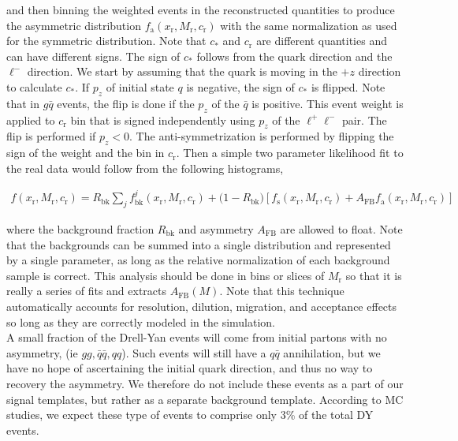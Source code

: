 \documentclass[
    10pt, %
    a4paper, %
    oneside, %
    headinclude,footinclude, %
    BCOR5mm, %
]{scrartcl}
\begin{document}
and then binning the weighted events in the reconstructed quantities to produce the asymmetric distribution $f_\mathrm{a}(x_\mathrm{r}, M_\mathrm{r}, c_\mathrm{r})$ 
with the same normalization as used for the symmetric distribution.  
Note that $c_*$ and $c_\mathrm{r}$ are different quantities and can have different signs.  
The sign of $c_*$ follows from the quark direction and the $\ell^-$ direction.  
We start by assuming that the quark is moving in the $+z$ direction to calculate $c_*$.  
If $p_z$ of initial state $q$ is negative, the sign of $c_*$ is flipped.  Note that in $g\bar q$ events, 
the flip is done if the $p_z$ of the $\bar q$ is positive.  
This event weight is applied to $c_\mathrm{r}$ bin that is signed independently using $p_z$ of the $\ell^+\ell^-$ pair.  
The flip is performed if $p_z<0$.  The anti-symmetrization is performed by flipping the sign of the weight and the bin in $c_\mathrm{r}$.  
Then a simple two parameter likelihood fit to the real data would follow from the following histograms,

\begin{align}
    f(x_\mathrm{r},M_\mathrm{r},c_\mathrm{r}) = R_\mathrm{bk} \sum_jf^j_\mathrm{bk}(x_\mathrm{r},M_\mathrm{r},c_\mathrm{r})+
    \biggl(1 - R_\mathrm{bk}\biggr )   \left[f_\mathrm{s}(x_\mathrm{r}, M_\mathrm{r}, c_\mathrm{r})+
    A_\mathrm{FB}f_\mathrm{a}(x_\mathrm{r}, M_\mathrm{r}, c_\mathrm{r})\right]
    \label{eq:template_schemeone}
\end{align}

where the background fraction $R_\mathrm{bk}$ and asymmetry $A_\mathrm{FB}$ are allowed to float.  
Note that the backgrounds can be summed into a single distribution and represented by a single parameter, 
as long as the relative normalization of each background sample is correct.  
This analysis should be done in bins or slices of $M_\mathrm{r}$ so that it is really a series of fits and extracts $A_\mathrm{FB}(M)$.  
Note that this technique automatically accounts for resolution, dilution, migration, and acceptance effects so long as 
they are correctly modeled in the simulation. \\


A small fraction of the Drell-Yan events will come from initial partons with no asymmetry, (ie $gg, \bar{q}\bar{q}, qq$).
Such events will still have a $q\bar{q}$ annihilation, but we have no hope of ascertaining the initial quark direction, 
and thus no way to recovery the asymmetry. We therefore do not include these events as a part of our signal templates, but
rather as a separate background template. 
According to MC studies, we expect these type of events to comprise only 3\% of the total DY events. \\
\end{document}
